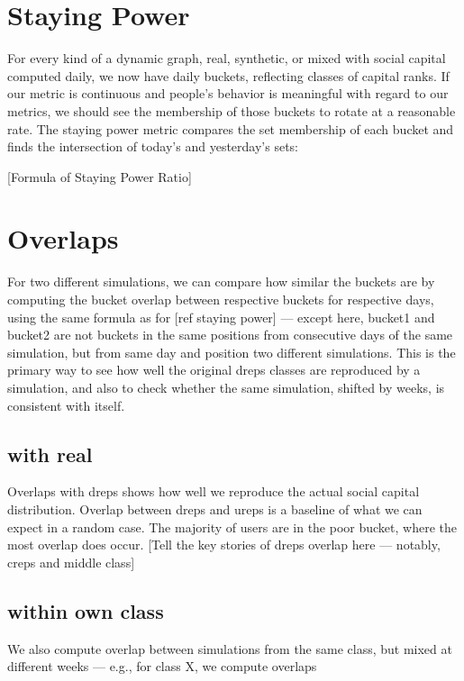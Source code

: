 \documentclass[10pt,oneside]{memoir}
\begin{document}
\section{Staying Power}
\label{stayingpower}

For every kind of a dynamic graph, real, synthetic, or mixed with social capital computed daily, we now have daily buckets, reflecting classes of capital ranks.  If our metric is continuous and people's behavior is meaningful with regard to our metrics, we should see the membership of those buckets to rotate at a reasonable rate.  The staying power metric compares the set membership of each bucket and finds the intersection of today's and yesterday's sets:


[Formula of Staying Power Ratio]


\section{Overlaps}
\label{overlaps}

For two different simulations, we can compare how similar the buckets are by computing the bucket overlap between respective buckets for respective days, using the same formula as for [ref staying power] --- except here, bucket1 and bucket2 are not buckets in the same positions from consecutive days of the same simulation,  but from same day and position two different simulations.  This is the primary way to see how well the original dreps classes are reproduced by a simulation, and also to check whether the same simulation, shifted by weeks, is consistent with itself.


\subsection{with real}
\label{withreal}

Overlaps with dreps shows how well we reproduce the actual social capital distribution.  Overlap between dreps and ureps is a baseline of what we can expect in a random case.  The majority of users are in the poor bucket, where the most overlap does occur.
[Tell the key stories of dreps overlap here --- notably, creps and middle class]


\subsection{within own class}
\label{withinownclass}

We also compute overlap between simulations from the same class, but mixed at different weeks --- e.g., for class X, we compute overlaps
\end{document}
